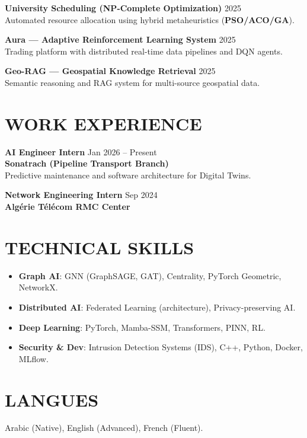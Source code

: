 \documentclass[a4paper,11pt]{article}
\begin{document}
\textbf{University Scheduling (NP-Complete Optimization)} \hfill 2025 \\
Automated resource allocation using hybrid metaheuristics (\textbf{PSO/ACO/GA}).

\textbf{Aura — Adaptive Reinforcement Learning System} \hfill 2025 \\
Trading platform with distributed real-time data pipelines and DQN agents.

\textbf{Geo-RAG — Geospatial Knowledge Retrieval} \hfill 2025 \\
Semantic reasoning and RAG system for multi-source geospatial data.

\section{WORK EXPERIENCE}
\textbf{AI Engineer Intern} \hfill Jan 2026 -- Present \\
\textbf{Sonatrach (Pipeline Transport Branch)} \\
Predictive maintenance and software architecture for Digital Twins.

\textbf{Network Engineering Intern} \hfill Sep 2024 \\
\textbf{Algérie Télécom RMC Center}

\section{TECHNICAL SKILLS}
\begin{itemize}
    \item \textbf{Graph AI}: GNN (GraphSAGE, GAT), Centrality, PyTorch Geometric, NetworkX.
    \item \textbf{Distributed AI}: Federated Learning (architecture), Privacy-preserving AI.
    \item \textbf{Deep Learning}: PyTorch, Mamba-SSM, Transformers, PINN, RL.
    \item \textbf{Security \& Dev}: Intrusion Detection Systems (IDS), C++, Python, Docker, MLflow.
\end{itemize}

\section{LANGUES}
Arabic (Native), English (Advanced), French (Fluent).
\end{document}
